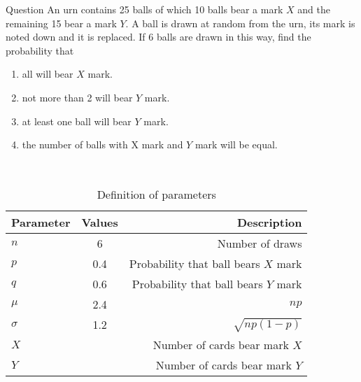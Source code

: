 \documentclass[journal,12pt,twocolumn]{IEEEtran}
\theoremstyle{remark}
\begin{document}
\let\vec\mathbf




\vspace{3cm}



\bigskip

\renewcommand{\thefigure}{\theenumi}
\renewcommand{\thetable}{\theenumi}
Question  An urn contains 25 balls of which 10 balls bear a mark $X$ and the remaining 15 bear a mark $Y$. A ball is drawn at random from the urn, its mark is noted down and it is replaced. If 6 balls are drawn in this way, find the probability that\\
\begin{enumerate}[label=(\alph*)]
\item all will bear $X$ mark.\\
\item not more than 2 will bear $Y$ mark.\\
\item at least one ball will bear $Y$ mark.\\
\item the number of balls with X mark and $Y$ mark will be equal.\\
\end{enumerate}
\solution  \\
\begin{table}[!ht]
\centering
\begin{tabular}{|l|c|r|}
    \hline
    Parameter & Values & Description\\
    \hline
    $n$ & 6 & Number of draws\\
    \hline
    $p$ & 0.4 & Probability that ball bears $X$ mark \\
    \hline
    $q$ & 0.6 & Probability that ball bears $Y$ mark \\
    \hline
    $\mu$ & 2.4 & $np$ \\
    \hline
    $\sigma $ & 1.2 & $\sqrt{np(1 - p)} $\\
    \hline
    $X$ &  & Number of cards bear mark $X$ \\
    \hline
    $Y$ &  & Number of cards bear mark $Y$ \\
    \hline
\end{tabular}
\caption{Definition of parameters}
\label{tab:gaussian/9/3/17}
\end{table}
\end{document}
